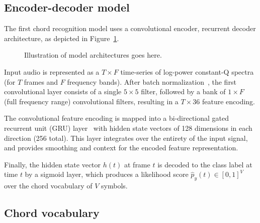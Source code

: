 \documentclass{article}
\begin{document}




\subsection{Encoder-decoder model}


The first chord recognition model uses a convolutional encoder, recurrent decoder architecture, as depicted in Figure~\ref{fig:model}. %
\begin{figure}
    \caption{Illustration of model architectures goes here.\label{fig:model}}
\end{figure}
Input audio is represented as a $T\times F$ time-series of log-power constant-Q spectra (for $T$ frames and $F$ frequency bands).
After batch normalization~\cite{ioffe2015batch}, the first convolutional layer consists of a single $5\times5$ filter, followed by a bank of $1\times F$ (full frequency range) convolutional filters, resulting in a $T\times 36$ feature encoding.

The convolutional feature encoding is mapped into a bi-directional gated recurrent unit (GRU) layer~\cite{chung2014empirical} with hidden state vectors of 128 dimensions in each direction (256 total).
This layer integrates over the entirety of the input signal, and provides smoothing and context for the encoded feature representation.

Finally, the hidden state vector $h(t)$ at frame $t$ is decoded to the class label at time $t$ by a sigmoid layer, which produces a likelihood score $\hat{p}_y(t) \in [0, 1]^{V}$ over the chord vocabulary of $V$ symbols.










\subsection{Chord vocabulary}
\end{document}
